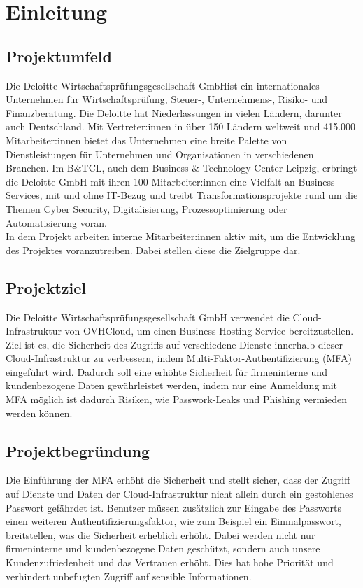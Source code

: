 \section{Einleitung}
\label{sec:Einleitung}


\subsection{Projektumfeld} 
\label{sec:Projektumfeld}
Die Deloitte Wirtschaftsprüfungsgesellschaft GmbHist ein internationales 
Unternehmen für Wirtschaftsprüfung, Steuer-, Unternehmens-, Risiko- und Finanzberatung. 
Die Deloitte hat Niederlassungen in vielen Ländern, darunter auch Deutschland. 
Mit Vertreter:innen in über 150 Ländern weltweit und 415.000 Mitarbeiter:innen bietet das Unternehmen eine breite Palette von Dienstleistungen für Unternehmen und Organisationen in verschiedenen Branchen.
Im B\&TCL, auch dem Business \& Technology Center Leipzig, erbringt die Deloitte
GmbH mit ihren 100 Mitarbeiter:innen eine Vielfalt an Business Services, mit und ohne IT-Bezug und treibt
Transformationsprojekte rund um die Themen Cyber Security, Digitalisierung,
Prozessoptimierung oder Automatisierung voran.
\\In dem Projekt arbeiten interne Mitarbeiter:innen aktiv mit, um die Entwicklung des
Projektes voranzutreiben. Dabei stellen diese die Zielgruppe dar.


\subsection{Projektziel} 
\label{sec:Projektziel}
Die Deloitte Wirtschaftsprüfungsgesellschaft GmbH verwendet die Cloud-Infrastruktur
von OVHCloud, um einen Business Hosting Service bereitzustellen. 
\\Ziel ist es, die Sicherheit des Zugriffs auf verschiedene Dienste 
innerhalb dieser Cloud-Infrastruktur zu verbessern, indem 
Multi-Faktor-Authentifizierung (MFA) eingeführt wird. 
Dadurch soll eine erhöhte Sicherheit für firmeninterne und kundenbezogene 
Daten gewährleistet werden, indem nur eine Anmeldung mit MFA möglich ist dadurch Risiken, 
wie Passwork-Leaks und Phishing vermieden werden können.


\subsection{Projektbegründung} 
\label{sec:Projektbegruendung}
Die Einführung der MFA erhöht die Sicherheit und stellt sicher, dass der Zugriff 
auf Dienste und Daten der Cloud-Infrastruktur nicht allein durch ein gestohlenes
Passwort gefährdet ist.
Benutzer müssen zusätzlich zur Eingabe des Passworts einen weiteren Authentifizierungsfaktor, 
wie zum Beispiel ein Einmalpasswort, breitstellen, was die Sicherheit erheblich erhöht. 
Dabei werden nicht nur firmeninterne und kundenbezogene Daten geschützt, sondern auch 
unsere Kundenzufriedenheit und das Vertrauen erhöht. Dies hat hohe Priorität und 
verhindert unbefugten Zugriff auf sensible Informationen.


